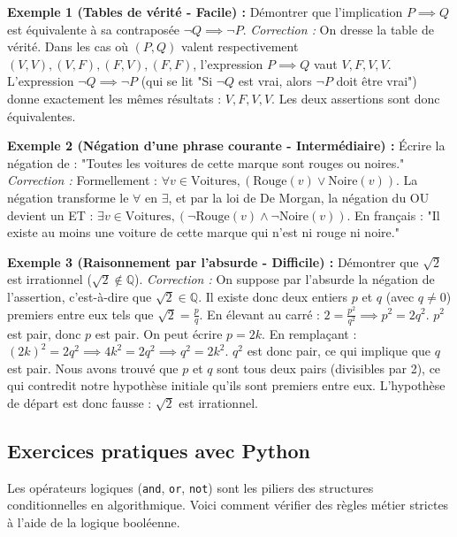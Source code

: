 \documentclass[12pt,a4paper]{report}
\begin{document}
\textbf{Exemple 1 (Tables de vérité - Facile) :} 
Démontrer que l'implication $P \implies Q$ est équivalente à sa contraposée $\neg Q \implies \neg P$.
\textit{Correction :} On dresse la table de vérité.
Dans les cas où $(P,Q)$ valent respectivement $(V,V), (V,F), (F,V), (F,F)$, 
l'expression $P \implies Q$ vaut $V, F, V, V$. 
L'expression $\neg Q \implies \neg P$ (qui se lit "Si $\neg Q$ est vrai, alors $\neg P$ doit être vrai") donne exactement les mêmes résultats : $V, F, V, V$. Les deux assertions sont donc équivalentes.

\textbf{Exemple 2 (Négation d'une phrase courante - Intermédiaire) :}
Écrire la négation de : "Toutes les voitures de cette marque sont rouges ou noires."
\textit{Correction :} Formellement : $\forall v \in \text{Voitures}, (\text{Rouge}(v) \lor \text{Noire}(v))$.
La négation transforme le $\forall$ en $\exists$, et par la loi de De Morgan, la négation du OU devient un ET :
$\exists v \in \text{Voitures}, (\neg\text{Rouge}(v) \land \neg\text{Noire}(v))$.
En français : "Il existe au moins une voiture de cette marque qui n'est ni rouge ni noire."

\textbf{Exemple 3 (Raisonnement par l'absurde - Difficile) :}
Démontrer que $\sqrt{2}$ est irrationnel ($\sqrt{2} \notin \mathbb{Q}$).
\textit{Correction :} On suppose par l'absurde la négation de l'assertion, c'est-à-dire que $\sqrt{2} \in \mathbb{Q}$. 
Il existe donc deux entiers $p$ et $q$ (avec $q \neq 0$) premiers entre eux tels que $\sqrt{2} = \frac{p}{q}$.
En élevant au carré : $2 = \frac{p^2}{q^2} \implies p^2 = 2q^2$.
$p^2$ est pair, donc $p$ est pair. On peut écrire $p = 2k$.
En remplaçant : $(2k)^2 = 2q^2 \implies 4k^2 = 2q^2 \implies q^2 = 2k^2$.
$q^2$ est donc pair, ce qui implique que $q$ est pair.
Nous avons trouvé que $p$ et $q$ sont tous deux pairs (divisibles par 2), ce qui contredit notre hypothèse initiale qu'ils sont premiers entre eux. L'hypothèse de départ est donc fausse : $\sqrt{2}$ est irrationnel.

\subsection{Exercices pratiques avec Python}
Les opérateurs logiques (\texttt{and}, \texttt{or}, \texttt{not}) sont les piliers des structures conditionnelles en algorithmique. Voici comment vérifier des règles métier strictes à l'aide de la logique booléenne.
\end{document}
